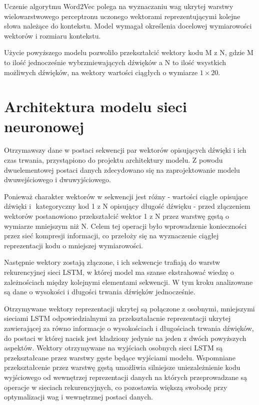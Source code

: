 {{        Uczenie algorytmu Word2Vec polega na wyznaczaniu wag ukrytej warstwy wielowarstwowego perceptronu
        uczonego wektorami reprezentującymi kolejne słowa należące do kontekstu.
        Model wymagał określenia docelowej wymiarowości wektorów i\,\,rozmiaru kontekstu. 

        Użycie powyższego modelu pozwoliło przekształcić  wektory kodu M\,\,z\,\,N, gdzie M to ilość jednocześnie wybrzmiewających dźwięków a N to ilość wsystkich możliwych dźwięków, na wektory wartości ciągłych o wymiarze \(1 \times 20\).
    }
    
    \section{Architektura modelu sieci neuronowej}\label{chap:main_model}
    {
        Otrzymawszy dane w\,\,postaci sekwencji par wektorów opisujących dźwięki i\,\,ich czas trwania,
        przystąpiono do projektu architektury modelu. Z\,\,powodu dwuelementowej postaci danych
        zdecydowano się na zaprojektowanie modelu dwuwejściowego i\,\,dwuwyjściowego.

        Ponieważ charakter wektorów w\,\,sekwencji jest różny - wartości ciągłe opisujące dźwięki i\,\,
        kategoryczny kod 1 z\,\,N opisujący długość dźwięku - przed złączeniem wektorów postanowiono 
        przekształcić wektor 1 z\,\,N przez warstwę gęstą o\,\,wymiarze mniejszym niż\,\,N. Celem tej operacji
        było wprowadzenie konieczności przez sieć kompresji informacji, co przełoży się 
        na wyznaczenie ciągłej reprezentacji kodu o\,\,mniejszej wymiarowości. 

        Następnie wektory zostają złączone, i\,\,ich sekwencje trafiają do warstw rekurencyjnej sieci LSTM, w\,\,której model ma szanse ekstrahować wiedzę o\,\,zależnościach między kolejnymi elementami sekwencji. W tym kroku analizowane są dane o wysokości i długości trwania dźwięków jednocześnie.

        Otrzymywane wektory reprezentacji ukrytej są połączone z\,\,osobnymi, 
        mniejszymi sieciami LSTM odpowiedzialnymi za przekształacnie reprezentacji 
        ukrytej zawierającej za równo informacje o wysokościach i długościach trwania dźwięków, 
        do postaci w której nacisk jest kładziony jedynie na jeden z dwóch powyższych aspektów. 
        Wektory otrzymywane na wyjściach osobnych sieci LSTM są przekształcane przez warstwy gęste będące wyjściami modelu. 
        Wspomniane przekształcenie przez warstwę gęstą umożliwia silniejsze uniezależnienie kodu 
        wyjściowego od wewnętrzej reprezentacji danych na których przeprowadzane są operacje 
        w sieciach rekurencyjnych, co pozostawia większą swobodę przy optymalizacji wag i wewnętrznej postaci danych.
        
}}
